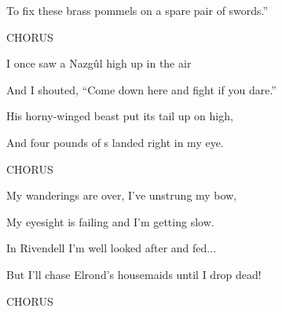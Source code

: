 To fix these brass pommels on a spare pair of swords.”

CHORUS

I once saw a Nazg\^ul high up in the air

And I shouted, “Come down here and fight if you dare.”

His horny-winged beast put its tail up on high,

And four pounds of s landed right in my eye.

CHORUS

My wanderings are over, I’ve unstrung my bow,

My eyesight is failing and I’m getting slow.

In Rivendell I’m well looked after and fed...

But I’ll chase Elrond’s housemaids until I drop dead!

CHORUS